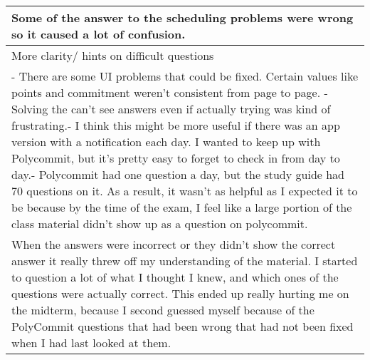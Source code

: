 \begin{longtable}{|p{1\linewidth}|}
		\hline
		Some of the answer to the scheduling problems were wrong so it caused a lot of confusion.                                                                                                                                                                                                                                                                                                                                                                                                                                                                                                                                                                                                        \\
		\hline
		More clarity/ hints on difficult questions                                                                                                                                                                                                                                                                                                                                                                                                                                                                                                                                                                                                                                                       \\
		\hline
		-   There are some UI problems that could be fixed. Certain values like points and commitment weren't consistent from page to page. -   Solving the can't see answers even if actually trying was kind of frustrating.-   I think this might be more useful if there was an app version with a notification each day. I wanted to keep up with Polycommit, but it's pretty easy to forget to check in from day to day.-   Polycommit had one question a day, but the study guide had 70 questions on it. As a result, it wasn't as helpful as I expected it to be because by the time of the exam, I feel like a large portion of the class material didn't show up as a question on polycommit. \\
		\hline
		When the answers were incorrect or they didn't show the correct answer it really threw off my understanding of the material. I started to question a lot of what I thought I knew, and which ones of the questions were actually correct. This ended up really hurting me on the midterm, because I second guessed myself because of the PolyCommit questions that had been wrong that had not been fixed when I had last looked at them.                                                                                                                                                                                                                                                        \\

\end{longtable}

